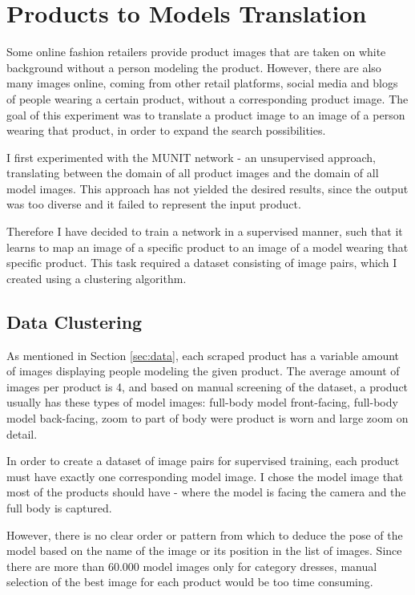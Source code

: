 \documentclass[12pt]{report}
\begin{document}
\pagebreak
\section{Products to Models Translation}
Some online fashion retailers provide product images that are taken on white background without a person modeling the product. However, there are also many images online, coming from other retail platforms, social media and blogs of people wearing a certain product, without a corresponding product image. The goal of this experiment was to translate a product image to an image of a person wearing that product, in order to expand the search possibilities.

I first experimented with the MUNIT network - an unsupervised approach, translating between the domain of all product images and the domain of all model images. This approach has not yielded the desired results, since the output was too diverse and it failed to represent the input product.

Therefore I have decided to train a network in a supervised manner, such that it learns to map an image of a specific product to an image of a model wearing that specific product. This task required a dataset consisting of image pairs, which I created using a clustering algorithm.

\subsection{Data Clustering}
As mentioned in Section \ref{sec:data}, each scraped product has a variable amount of images displaying people modeling the given product. The average amount of images per product is 4, and based on manual screening of the dataset, a product usually has these types of model images: full-body model front-facing, full-body model back-facing, zoom to part of body were product is worn and large zoom on detail.

In order to create a dataset of image pairs for supervised training, each product must have exactly one corresponding model image. I chose the model image that most of the products should have - where the model is facing the camera and the full body is captured. 

However, there is no clear order or pattern from which to deduce the pose of the model based on the name of the image or its position in the list of images. Since there are more than 60.000 model images only for category dresses, manual selection of the best image for each product would be too time consuming.
\end{document}
